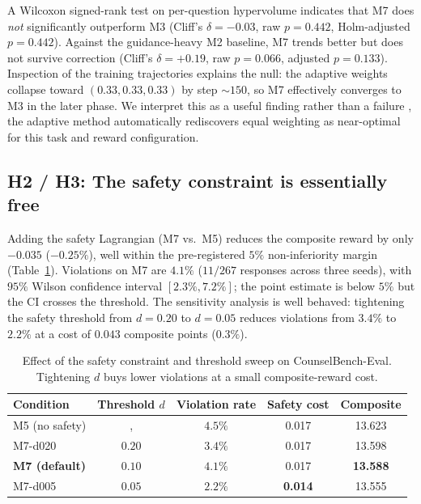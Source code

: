 \documentclass[10pt,twocolumn]{article}
\begin{document}
A Wilcoxon signed-rank test on per-question hypervolume \citep{zitzler1999hv} indicates that M7 does \emph{not} significantly outperform M3 (Cliff's $\delta=-0.03$, raw $p=0.442$, Holm-adjusted $p=0.442$). Against the guidance-heavy M2 baseline, M7 trends better but does not survive correction (Cliff's $\delta=+0.19$, raw $p=0.066$, adjusted $p=0.133$). Inspection of the training trajectories explains the null: the adaptive weights collapse toward $(0.33, 0.33, 0.33)$ by step ${\sim}150$, so M7 effectively converges to M3 in the later phase. We interpret this as a useful finding rather than a failure ,  the adaptive method automatically rediscovers equal weighting as near-optimal for this task and reward configuration.

\subsection*{H2 / H3: The safety constraint is essentially free}

Adding the safety Lagrangian (M7 vs.\ M5) reduces the composite reward by only $-0.035$ ($-0.25\%$), well within the pre-registered $5\%$ non-inferiority margin (Table~\ref{tab:safety_ablation}). Violations on M7 are $4.1\%$ ($11/267$ responses across three seeds), with $95\%$ Wilson confidence interval $[2.3\%, 7.2\%]$; the point estimate is below $5\%$ but the CI crosses the threshold. The sensitivity analysis is well behaved: tightening the safety threshold from $d{=}0.20$ to $d{=}0.05$ reduces violations from $3.4\%$ to $\mathbf{2.2\%}$ at a cost of $0.043$ composite points ($0.3\%$).

\begin{table}[!t]
\centering
\small
\begin{tabular}{lcccc}
\toprule
Condition & Threshold $d$ & Violation rate & Safety cost & Composite \\
\midrule
M5 (no safety)         & ,     & $4.5\%$ & 0.017 & 13.623 \\
M7-d020                & $0.20$ & $3.4\%$ & 0.017 & 13.598 \\
\textbf{M7 (default)}  & $0.10$ & $4.1\%$ & 0.017 & \textbf{13.588} \\
M7-d005                & $0.05$ & $\mathbf{2.2\%}$ & \textbf{0.014} & 13.555 \\
\bottomrule
\end{tabular}
\caption{Effect of the safety constraint and threshold sweep on CounselBench-Eval. Tightening $d$ buys lower violations at a small composite-reward cost.}
\label{tab:safety_ablation}
\end{table}
\end{document}
